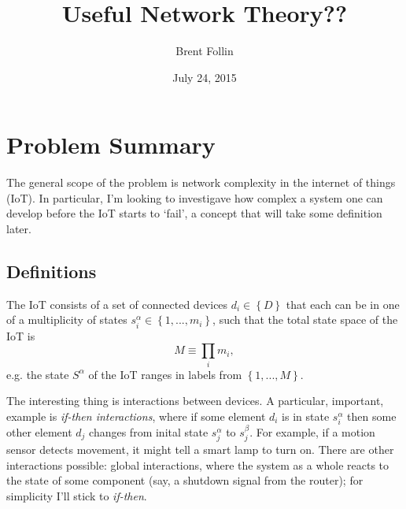 \documentclass{article}
\title{Useful Network Theory??}
\author{Brent Follin}
\date{July 24, 2015}
\def\be{\begin{equation*}}
\def\ee{\end{equation*}}
\begin{document}
\maketitle

\section{Problem Summary} %
The general scope of the problem is network complexity in the internet of things (IoT). In particular, I'm looking to investigave how complex a system one can develop before the IoT starts to `fail', a concept that will take some definition later. 
\subsection{Definitions}
The IoT consists of a set of connected devices $d_{i} \in \left\{D \right\}$ that each can be in one of a multiplicity of states $s^\alpha_i \in \left\{1, ..., m_i\right\}$, such that the total state space of the IoT is 
\be
M \equiv \prod_i m_i,
\ee
e.g. the state $S^\alpha$ of the IoT ranges in labels from $\left\{1, ..., M\right\}$.

The interesting thing is interactions between devices. A particular, important, example is \textit{if-then interactions}, where if some element $d_i$ is in state $s^\alpha_i$ then some other element $d_j$ changes from inital state $s^\alpha_j$ to $s^\beta_j$. For example, if a motion sensor detects movement, it might tell a smart lamp to turn on. There are other interactions possible: global interactions, where the system as a whole reacts to the state of some component (say, a shutdown signal from the router); for simplicity I'll stick to \textit{if-then}. 
\end{document}

